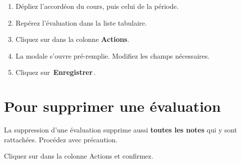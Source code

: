 \documentclass[12pt,a4paper]{report}
\newcommand{\bouton}[1]{{\colorbox{emerald}{\small\sffamily\bfseries\color{white}\,#1\,}}}
\begin{document}
\begin{etape}[title=Proc\'edure : Modifier une \'evaluation]
\begin{enumerate}[leftmargin=1.5cm,label=\textbf{\arabic*.},itemsep=8pt]
  \item D\'epliez l'accord\'eon du cours, puis celui de la p\'eriode.
  \item Rep\'erez l'\'evaluation dans la liste tabulaire.
  \item Cliquez sur \textcolor{indigo}{\faPen} dans la colonne \textbf{Actions}.
  \item La modale s'ouvre pr\'e-remplie. Modifiez les champs n\'ecessaires.
  \item Cliquez sur \bouton{Enregistrer}.
\end{enumerate}
\end{etape}

\section{Pour supprimer une \'evaluation}

\begin{attention}
La suppression d'une \'evaluation supprime aussi \textbf{toutes les notes} qui y sont rattach\'ees. Proc\'edez avec pr\'ecaution.
\end{attention}

Cliquez sur \textcolor{rose}{\faTrash} dans la colonne Actions et confirmez.


\end{document}
